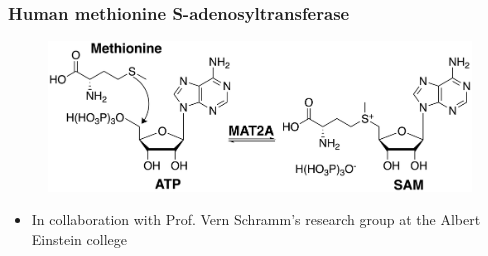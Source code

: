 \documentclass{beamer}
\begin{document}
\begin{frame}
\frametitle{Human methionine S-adenosyltransferase}
\begin{figure}
\centering 
\includegraphics[scale=0.6]{figures/mat2a-reaction.png}
\end{figure}
\begin{itemize}
\item In collaboration with Prof. Vern Schramm's research group at the Albert Einstein college 
\end{itemize}
\end{frame}
\end{document}
